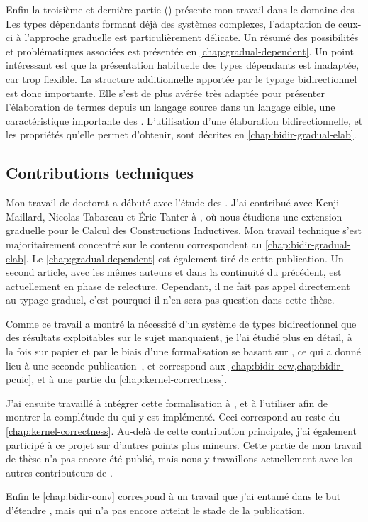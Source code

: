 Enfin la troisième et dernière partie ()
présente mon travail dans le domaine des .
Les types dépendants formant déjà des systèmes
complexes, l’adaptation de ceux-ci à l’approche graduelle est particulièrement
délicate. Un résumé des possibilités et problématiques associées est présentée
en \cref{chap:gradual-dependent}.
Un point intéressant est que la présentation habituelle
des types dépendants est inadaptée, car trop flexible.
La structure additionnelle apportée par le typage bidirectionnel est donc importante.
Elle s’est de plus avérée très adaptée pour présenter
l’élaboration de termes depuis un langage source dans un langage cible, une
caractéristique importante des .
L’utilisation d’une élaboration bidirectionnelle, et les propriétés qu’elle
permet d’obtenir, sont décrites en \cref{chap:bidir-gradual-elab}.

\subsection{Contributions techniques}

Mon travail de doctorat a débuté avec l’étude des  .
J’ai contribué avec Kenji Maillard, Nicolas Tabareau et Éric Tanter à
, où nous étudions une extension graduelle
pour le Calcul des Constructions Inductives. Mon travail technique s’est
majoritairement concentré sur le contenu correspondent au \cref{chap:bidir-gradual-elab}.
Le \cref{chap:gradual-dependent} est également tiré de cette publication.
Un second article, avec les mêmes auteurs et dans la continuité du précédent,
est actuellement en phase de relecture. Cependant, il
ne fait pas appel directement au typage graduel, c’est pourquoi il n’en
sera pas question dans cette thèse.

Comme ce travail a montré la nécessité d’un système de types bidirectionnel
que des résultats exploitables sur le sujet manquaient, je l’ai
étudié plus en détail, à la fois sur papier et par le biais d’une
formalisation se basant sur ,
ce qui a donné lieu à une seconde publication~,
et correspond aux \cref{chap:bidir-ccw,chap:bidir-pcuic}, et à une partie du
\cref{chap:kernel-correctness}.

J’ai ensuite travaillé à intégrer cette formalisation à
, et à l’utiliser afin de montrer la complétude du 
qui y est implémenté. Ceci correspond au reste du \cref{chap:kernel-correctness}.
Au-delà de cette contribution principale,
j’ai également participé à ce projet sur d’autres points plus mineurs.
Cette partie de mon travail de thèse n’a pas encore été publié, mais nous y
travaillons actuellement avec les autres contributeurs de .

Enfin le \cref{chap:bidir-conv} correspond à un travail que j’ai entamé dans
le but d’étendre , mais qui n’a pas encore atteint le stade de la
publication.